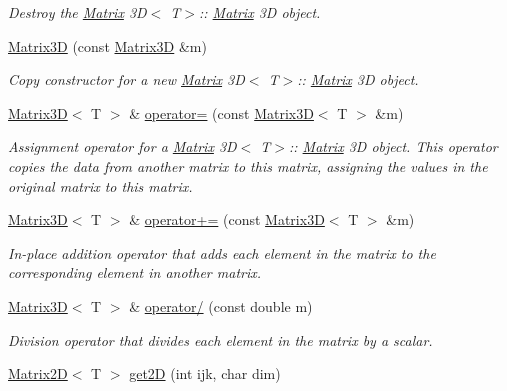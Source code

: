 \begin{DoxyCompactItemize}
\begin{DoxyCompactList}\small\item\em Destroy the \mbox{\hyperlink{classMatrix}{Matrix}} 3D$<$ T$>$\+:\+: \mbox{\hyperlink{classMatrix}{Matrix}} 3D object. \end{DoxyCompactList}\item 
\mbox{\hyperlink{classMatrix3D_ae3fc93ef3456a36c92f8cbb7db01c3a9}{Matrix3D}} (const \mbox{\hyperlink{classMatrix3D}{Matrix3D}} \&m)
\begin{DoxyCompactList}\small\item\em Copy constructor for a new \mbox{\hyperlink{classMatrix}{Matrix}} 3D$<$ T$>$\+:\+: \mbox{\hyperlink{classMatrix}{Matrix}} 3D object. \end{DoxyCompactList}\item 
\mbox{\hyperlink{classMatrix3D}{Matrix3D}}$<$ T $>$ \& \mbox{\hyperlink{classMatrix3D_a0e84724f089ae3478283ea81d0b866af}{operator=}} (const \mbox{\hyperlink{classMatrix3D}{Matrix3D}}$<$ T $>$ \&m)
\begin{DoxyCompactList}\small\item\em Assignment operator for a \mbox{\hyperlink{classMatrix}{Matrix}} 3D$<$ T$>$\+:\+: \mbox{\hyperlink{classMatrix}{Matrix}} 3D object. This operator copies the data from another matrix to this matrix, assigning the values in the original matrix to this matrix. \end{DoxyCompactList}\item 
\mbox{\hyperlink{classMatrix3D}{Matrix3D}}$<$ T $>$ \& \mbox{\hyperlink{classMatrix3D_a10b206ad9106931f7aa46a7b4d45c851}{operator+=}} (const \mbox{\hyperlink{classMatrix3D}{Matrix3D}}$<$ T $>$ \&m)
\begin{DoxyCompactList}\small\item\em In-\/place addition operator that adds each element in the matrix to the corresponding element in another matrix. \end{DoxyCompactList}\item 
\mbox{\hyperlink{classMatrix3D}{Matrix3D}}$<$ T $>$ \& \mbox{\hyperlink{classMatrix3D_ad45bff7f2159a4ba0aa4546635e8a73f}{operator/}} (const double m)
\begin{DoxyCompactList}\small\item\em Division operator that divides each element in the matrix by a scalar. \end{DoxyCompactList}\item 
\mbox{\hyperlink{classMatrix2D}{Matrix2D}}$<$ T $>$ \mbox{\hyperlink{classMatrix3D_ac5c77248be46bfef323f0229f6e0a59c}{get2D}} (int ijk, char dim)

\end{DoxyCompactItemize}
